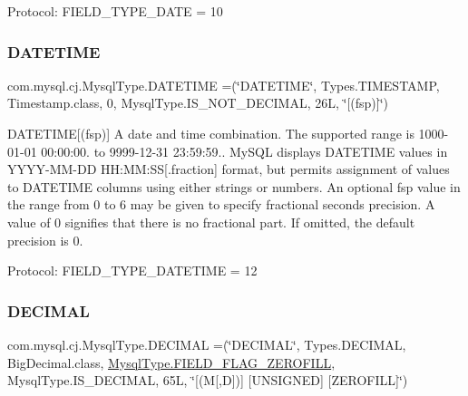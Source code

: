Protocol\+: F\+I\+E\+L\+D\+\_\+\+T\+Y\+P\+E\+\_\+\+D\+A\+TE = 10 \mbox{\label{enumcom_1_1mysql_1_1cj_1_1_mysql_type_a10ab4319f5464017da0b6c5d8ba57840}} 
\subsubsection{\texorpdfstring{D\+A\+T\+E\+T\+I\+ME}{DATETIME}}
{\footnotesize\ttfamily com.\+mysql.\+cj.\+Mysql\+Type.\+D\+A\+T\+E\+T\+I\+ME =(\char`\"{}D\+A\+T\+E\+T\+I\+ME\char`\"{}, Types.\+T\+I\+M\+E\+S\+T\+A\+MP, Timestamp.\+class, 0, Mysql\+Type.\+I\+S\+\_\+\+N\+O\+T\+\_\+\+D\+E\+C\+I\+M\+AL, 26\+L, \char`\"{}\mbox{[}(fsp)\mbox{]}\char`\"{})}

D\+A\+T\+E\+T\+I\+ME\mbox{[}(fsp)\mbox{]} A date and time combination. The supported range is \textquotesingle{}1000-\/01-\/01 00\+:00\+:00.\textquotesingle{} to \textquotesingle{}9999-\/12-\/31 23\+:59\+:59.\textquotesingle{}. My\+S\+QL displays D\+A\+T\+E\+T\+I\+ME values in \textquotesingle{}Y\+Y\+Y\+Y-\/\+M\+M-\/\+DD H\+H\+:\+MM\+:SS\mbox{[}.fraction\mbox{]}\textquotesingle{} format, but permits assignment of values to D\+A\+T\+E\+T\+I\+ME columns using either strings or numbers. An optional fsp value in the range from 0 to 6 may be given to specify fractional seconds precision. A value of 0 signifies that there is no fractional part. If omitted, the default precision is 0.

Protocol\+: F\+I\+E\+L\+D\+\_\+\+T\+Y\+P\+E\+\_\+\+D\+A\+T\+E\+T\+I\+ME = 12 \mbox{\label{enumcom_1_1mysql_1_1cj_1_1_mysql_type_a90f5401b1fa7f31d2d384156fa552e2c}} 
\subsubsection{\texorpdfstring{D\+E\+C\+I\+M\+AL}{DECIMAL}}
{\footnotesize\ttfamily com.\+mysql.\+cj.\+Mysql\+Type.\+D\+E\+C\+I\+M\+AL =(\char`\"{}D\+E\+C\+I\+M\+AL\char`\"{}, Types.\+D\+E\+C\+I\+M\+AL, Big\+Decimal.\+class, \mbox{\hyperlink{enumcom_1_1mysql_1_1cj_1_1_mysql_type_abb76a1f2f3dac9a30d1b559b8ba66a48}{Mysql\+Type.\+F\+I\+E\+L\+D\+\_\+\+F\+L\+A\+G\+\_\+\+Z\+E\+R\+O\+F\+I\+LL}}, Mysql\+Type.\+I\+S\+\_\+\+D\+E\+C\+I\+M\+AL, 65\+L, \char`\"{}\mbox{[}(\+M\mbox{[},\+D\mbox{]})\mbox{]} \mbox{[}\+U\+N\+S\+I\+G\+N\+E\+D\mbox{]} \mbox{[}\+Z\+E\+R\+O\+F\+I\+L\+L\mbox{]}\char`\"{})}

